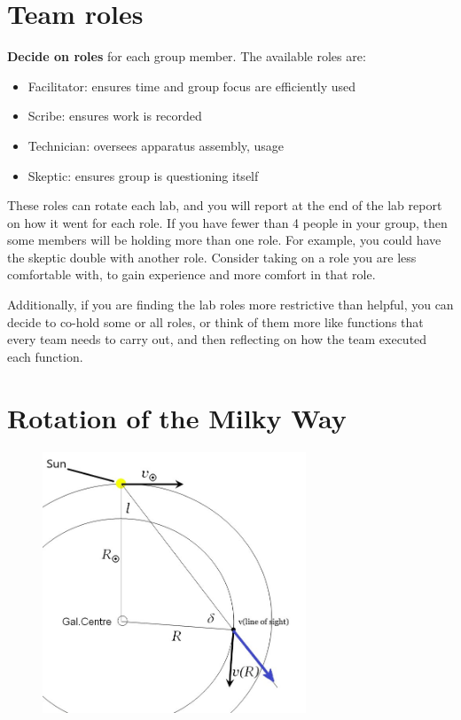 \section{Team roles}

\textbf{Decide on roles} for each group member. The available roles are:

\begin{itemize}
	\item Facilitator: ensures time and group focus are efficiently used
	\item Scribe: ensures work is recorded
	\item Technician: oversees apparatus assembly, usage
	\item Skeptic: ensures group is questioning itself
\end{itemize}

These roles can rotate each lab, and you will report at the end of the lab report on how it went for each role. If you have fewer than 4 people in your group, then some members will be holding more than one role. For example, you could have the skeptic double with another role. Consider taking on a role you are less comfortable with, to gain experience and more comfort in that role.

Additionally, if you are finding the lab roles more restrictive than helpful, you can decide to co-hold some or all roles, or think of them more like functions that every team needs to carry out, and then reflecting on how the team executed each function.

\section{Rotation of the Milky Way}

\begin{figure}
	\centering
	\includegraphics[width = 0.7\textwidth]{srt-galaxy-rotation/geometry_edit}
	\caption{}\label{sgr:fig:gal-geom}
\end{figure}

